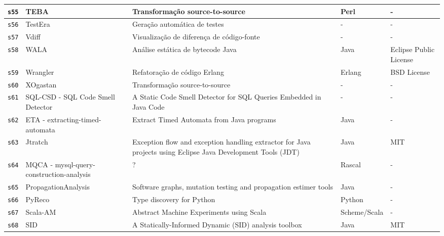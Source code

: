 \begin{longtable}{| l | p{4.5cm} | p{7cm} | p{2.5cm} | p{2.5cm} |}
    \hline
    \texttt{s55} &
      TEBA &
      Transformação source-to-source &
      Perl &
      - \\
    \hline
    \texttt{s56} &
      TestEra &
      Geração automática de testes &
      - &
      - \\
    \hline
    \texttt{s57} &
      Vdiff &
      Visualização de diferença de código-fonte &
      - &
      - \\
    \hline
    \texttt{s58} &
      WALA &
      Análise estática de bytecode Java &
      Java &
      Eclipse Public License \\
    \hline
    \texttt{s59} &
      Wrangler &
      Refatoração de código Erlang &
      Erlang &
      BSD License \\
    \hline
    \texttt{s60} &
      XOgastan &
      Transformação source-to-source &
      - &
      - \\
    \hline
    \texttt{s61} &
      SQL-CSD - SQL Code Smell Detector &
      A Static Code Smell Detector for SQL Queries Embedded in Java Code &
      - &
      - \\
    \hline
    \texttt{s62} &
      ETA - extracting-timed-automata &
      Extract Timed Automata from Java programs &
      Java &
      - \\
    \hline
    \texttt{s63} &
      Jtratch &
      Exception flow and exception handling extractor for Java projects using Eclipse Java Development Tools (JDT) &
      Java &
      MIT \\
    \hline
    \texttt{s64} &
      MQCA - mysql-query-construction-analysis &
      ? &
      Rascal &
      - \\
    \hline
    \texttt{s65} &
      PropagationAnalysis &
      Software graphs, mutation testing and propagation estimer tools &
      Java &
      - \\
    \hline
    \texttt{s66} &
      PyReco &
      Type discovery for Python &
      Python &
      - \\
    \hline
    \texttt{s67} &
      Scala-AM &
      Abstract Machine Experiments using Scala &
      Scheme/Scala &
      - \\
    \hline
    \texttt{s68} &
      SID &
      A Statically-Informed Dynamic (SID) analysis toolbox &
      Java &
      MIT \\
    \hline
  \hline
\end{longtable}
